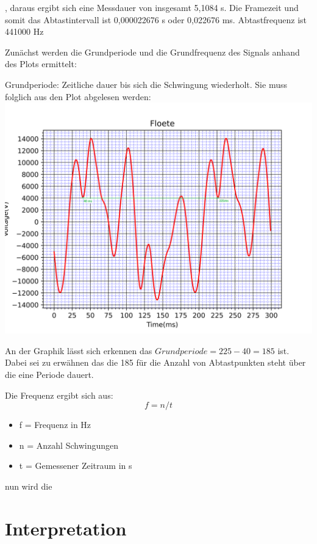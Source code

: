 , daraus ergibt sich eine Messdauer von insgesamt 5,1084 s.
Die Framezeit und somit das Abtastintervall ist 0,000022676 s oder 0,022676 ms.
Abtastfrequenz ist 441000 Hz


Zunächst werden die Grundperiode und die Grundfrequenz des Signals anhand des Plots ermittelt:

Grundperiode: Zeitliche dauer bis sich die Schwingung wiederholt. Sie muss folglich aus den Plot abgelesen werden:
\includegraphics[scale=0.05]{media/Signal_Raster_Periode.png}

An der Graphik lässt sich erkennen das $ Grundperiode = 225 - 40 = 185 $ ist.
Dabei sei zu erwähnen das die 185 für die Anzahl von Abtastpunkten steht über die eine Periode dauert.

Die Frequenz ergibt sich aus:
\begin{equation}
	f = n / t
\end{equation}
\begin{itemize}
	\item f = Frequenz in Hz
	\item n = Anzahl Schwingungen
	\item t = Gemessener Zeitraum in s
\end{itemize}




nun wird die 



\section{Interpretation}
\label{chap:VERSUCH_1_INTERPRETATION}
